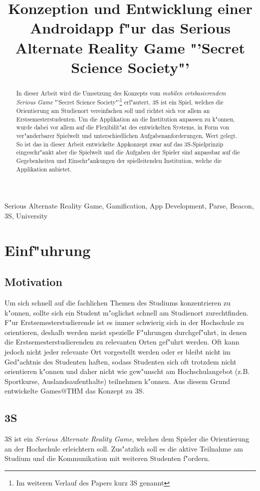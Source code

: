 \documentclass{article}
\title{Konzeption und Entwicklung einer Androidapp f"ur das Serious Alternate Reality Game "'Secret Science Society"'}
\begin{document}
%
\maketitle
%
\begin{abstract}
In dieser Arbeit wird die Umsetzung des Konzepts vom \textit{mobilen ortsbasierendem Serious Game} "'Secret Science Society"'\footnote{Im weiteren Verlauf des Papers kurz 3S genannt} erl"autert. 3S ist ein Spiel, welches die Orientierung am Studienort vereinfachen soll und richtet sich vor allem an Erstsemesterstudenten. Um die Applikation an die Institution anpassen zu k"onnen, wurde dabei vor allem auf die Flexibilit"at des entwickelten Systems, in Form von ver"anderbarer Spielwelt und unterschiedlichen Aufgabenanforderungen, Wert gelegt. So ist das in dieser Arbeit entwickelte Appkonzept zwar auf das 3S-Spielprinzip eingeschr"ankt aber die Spielwelt und die Aufgaben der Spieler sind anpassbar auf die Gegebenheiten und Einschr"ankungen der spielleitenden Institution, welche die Applikation anbietet.
\end{abstract}
%
\begin{keywords}
Serious Alternate Reality Game, Gamification, App Development, Parse, Beacon, 3S, University
\end{keywords}
%

\section{Einf"uhrung}
\label{sec:intro}

\subsection{Motivation}
\label{subsec:Motivation}
Um sich schnell auf die fachlichen Themen des Studiums konzentrieren zu k"onnen, sollte sich ein Student m"oglichst schnell am Studienort zurechtfinden. 
F"ur Erstsemesterstudierende ist es immer schwierig sich in der Hochschule zu orientieren, deshalb werden meist spezielle F"uhrungen durchgef"uhrt, in denen die Erstsemesterstudierenden zu relevanten Orten gef"uhrt werden. Oft kann jedoch nicht jeder relevante Ort vorgestellt werden oder er bleibt nicht im Ged"achtnis des Studenten haften, sodass Studenten sich oft trotzdem nicht orientieren k"onnen und daher nicht wie gew"unscht am Hochschulangebot (z.B. Sportkurse, Auslandsaufenthalte) teilnehmen k"onnen.
Aus diesem Grund entwickelte Games@THM das Konzept zu 3S. 

\subsection{3S}
\label{subsec:drei_s}
3S ist ein \textit{Serious Alternate Reality Game}, welches dem Spieler die Orientierung an der Hochschule erleichtern soll. Zus"atzlich soll es die aktive Teilnahme am Studium und die Kommunikation mit weiteren Studenten f"ordern.
\end{document}
